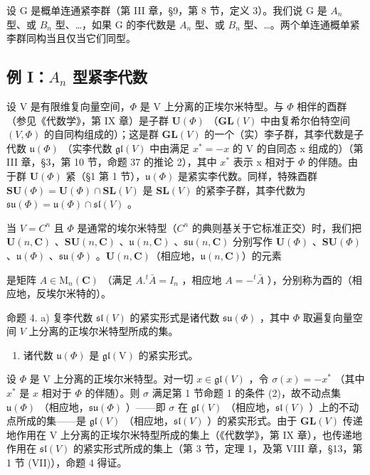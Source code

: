 设 G 是概单连通紧李群（第 III 章，§9，第 8 节，定义 3）。我们说 G 是 \(A_{n}\) 型、或 \(B_{n}\) 型、\ldots，如果 G 的李代数是 \(A_{n}\) 型、或 \(B_{n}\) 型、\ldots。两个单连通概单紧李群同构当且仅当它们同型。

\subsection{\texorpdfstring{例 I：\(A_{n}\) 型紧李代数}{例 I：A\_\{n\} 型紧李代数}}

设 V 是有限维复向量空间，\(\Phi\) 是 V 上分离的正埃尔米特型。与 \(\Phi\) 相伴的酉群（参见《代数学》，第 IX 章）是子群 \(\mathbf{U}(\Phi)\) （\(\mathbf{GL}(V)\) 中由复希尔伯特空间 \((V,\Phi)\) 的自同构组成的）；这是群 \(\mathbf{GL}(V)\) 的一个（实）李子群，其李代数是子代数 \(\mathfrak{u}(\Phi)\) （实李代数 \(\mathfrak{gl}(V)\) 中由满足 \(x^{*} = -x\) 的 V 的自同态 x 组成的）（第 III 章，§3，第 10 节，命题 37 的推论 2），其中 \(x^{*}\) 表示 x 相对于 \(\Phi\) 的伴随。由于群 \(\mathbf{U}(\Phi)\) 紧（§1 第 1 节），\(\mathfrak{u}(\Phi)\) 是紧实李代数。同样，特殊酉群 \(\mathbf{SU}(\Phi) = \mathbf{U}(\Phi) \cap \mathbf{SL}(V)\) 是 \(\mathbf{SL}(V)\) 的紧李子群，其李代数为 \(\mathfrak{su}(\Phi) = \mathfrak{u}(\Phi) \cap \mathfrak{sl}(V)\) 。

当 \(V = C^{n}\) 且 \(\varPhi\) 是通常的埃尔米特型（\(C^{n}\) 的典则基关于它标准正交）时，我们把 \(\mathbf{U}(n, \mathbf{C})\) 、\(\mathbf{SU}(n, \mathbf{C})\) 、\(\mathfrak{u}(n, \mathbf{C})\) 、\(\mathfrak{s}\mathfrak{u}(n, \mathbf{C})\) 分别写作 \(\mathbf{U}(\varPhi)\) 、\(\mathbf{SU}(\varPhi)\) 、\(\mathfrak{u}(\varPhi)\) 、\(\mathfrak{s}\mathfrak{u}(\varPhi)\) 。\(\mathbf{U}(n, \mathbf{C})\)（相应地，\(\mathfrak{u}(n, \mathbf{C})\)）的元素

是矩阵 \(A \in \mathrm{M}_{n}(\mathbf{C})\) （满足 \(A.^{t}\bar{A} = I_{n}\) ，相应地 \(A = -^{t}\bar{A}\) ），分别称为酉的（相应地，反埃尔米特的）。

命题 4. a) 复李代数 \(\mathfrak{sl}(V)\) 的紧实形式是诸代数 \(\mathfrak{su}(\Phi)\) ，其中 \(\Phi\) 取遍复向量空间 \(V\) 上分离的正埃尔米特型所成的集。

\begin{enumerate}
\def\labelenumi{\alph{enumi})}
\setcounter{enumi}{1}
\tightlist
\item
  诸代数 \(\mathfrak{u}(\varPhi)\) 是 \(\mathfrak{gl}(\mathrm{V})\) 的紧实形式。
\end{enumerate}

设 \(\varPhi\) 是 V 上分离的正埃尔米特型。对一切 \(x\in\mathfrak{gl}(V)\) ，令 \(\sigma(x)=-x^{*}\) （其中 \(x^{*}\) 是 \(x\) 相对于 \(\varPhi\) 的伴随）。则 \(\sigma\) 满足第 1 节命题 1 的条件 (2)，故不动点集 \(\mathfrak{u}(\varPhi)\) （相应地，\(\mathfrak{su}(\varPhi)\) ）——即 \(\sigma\) 在 \(\mathfrak{gl}(V)\) （相应地，\(\mathfrak{sl}(V)\) ）上的不动点所成的集——是 \(\mathfrak{gl}(V)\) （相应地，\(\mathfrak{sl}(V)\) ）的紧实形式。由于 \(\mathbf{GL}(V)\) 传递地作用在 V 上分离的正埃尔米特型所成的集上（《代数学》，第 IX 章），也传递地作用在 \(\mathfrak{sl}(V)\) 的紧实形式所成的集上（第 3 节，定理 1，及第 VIII 章，§13，第 1 节 (VII)），命题 4 得证。

